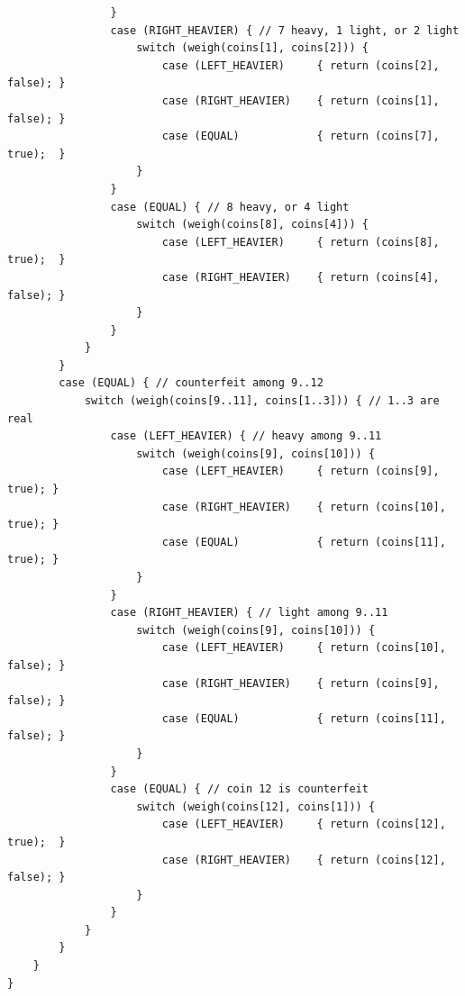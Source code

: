 \documentclass[answers]{exam}
\begin{document}
\begin{questions}
\begin{parts}
\begin{solution}
\begin{small}
\begin{verbatim}
                }
                case (RIGHT_HEAVIER) { // 7 heavy, 1 light, or 2 light
                    switch (weigh(coins[1], coins[2])) {
                        case (LEFT_HEAVIER)     { return (coins[2], false); }
                        case (RIGHT_HEAVIER)    { return (coins[1], false); }
                        case (EQUAL)            { return (coins[7], true);  }
                    }
                }
                case (EQUAL) { // 8 heavy, or 4 light
                    switch (weigh(coins[8], coins[4])) {
                        case (LEFT_HEAVIER)     { return (coins[8], true);  }
                        case (RIGHT_HEAVIER)    { return (coins[4], false); }
                    }
                }
            }
        }
        case (EQUAL) { // counterfeit among 9..12
            switch (weigh(coins[9..11], coins[1..3])) { // 1..3 are real
                case (LEFT_HEAVIER) { // heavy among 9..11
                    switch (weigh(coins[9], coins[10])) {
                        case (LEFT_HEAVIER)     { return (coins[9],  true); }
                        case (RIGHT_HEAVIER)    { return (coins[10], true); }
                        case (EQUAL)            { return (coins[11], true); }
                    }
                }
                case (RIGHT_HEAVIER) { // light among 9..11
                    switch (weigh(coins[9], coins[10])) {
                        case (LEFT_HEAVIER)     { return (coins[10], false); }
                        case (RIGHT_HEAVIER)    { return (coins[9],  false); }
                        case (EQUAL)            { return (coins[11], false); }
                    }
                }
                case (EQUAL) { // coin 12 is counterfeit
                    switch (weigh(coins[12], coins[1])) {
                        case (LEFT_HEAVIER)     { return (coins[12], true);  }
                        case (RIGHT_HEAVIER)    { return (coins[12], false); }
                    }
                }
            }
        }
    }
}
\end{verbatim}\end{small}
        \end{solution}


\end{parts}
\end{questions}
\end{document}
